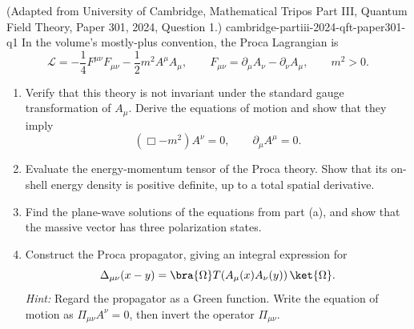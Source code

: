 
\begin{enumerate}
  {(Adapted from University of Cambridge, Mathematical Tripos Part III, Quantum Field Theory, Paper 301, 2024, Question 1.)}
  {cambridge-partiii-2024-qft-paper301-q1}
In the volume's mostly-plus convention, the Proca Lagrangian is
\[
 \mathcal L=-\frac14F^{\mu\nu}F_{\mu\nu}
 -\frac12m^2A^\mu A_\mu,
 \qquad
 F_{\mu\nu}=\partial_\mu A_\nu-\partial_\nu A_\mu,
 \qquad m^2>0.
\]
\begin{enumerate}
\item
Verify that this theory is not invariant under the standard gauge
transformation of \(A_\mu\).  Derive the equations of motion and show that
they imply
\[
 (\Box-m^2)A^\nu=0,
 \qquad
 \partial_\mu A^\mu=0.
\]
\item
Evaluate the energy-momentum tensor of the Proca theory.  Show that its
on-shell energy density is positive definite, up to a total spatial
derivative.
\item
Find the plane-wave solutions of the equations from part (a), and show that
the massive vector has three polarization states.
\item
Construct the Proca propagator, giving an integral expression for
\[
 \Delta_{\mu\nu}(x-y)
 =\bra{\Omega}T\!\left(A_\mu(x)A_\nu(y)\right)\ket{\Omega}.
\]
\emph{Hint:} Regard the propagator as a Green function.  Write the equation
of motion as \(\Pi_{\mu\nu}A^\nu=0\), then invert the operator
\(\Pi_{\mu\nu}\).
\end{enumerate}


\end{enumerate}
